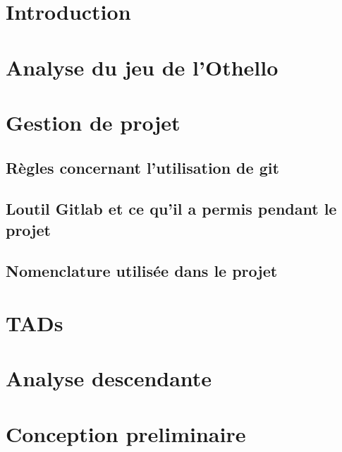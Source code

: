 


  

  \newpage
  \tableofcontents

  \newpage
  \section{Introduction}
    

  \newpage
  \section{Analyse du jeu de l'Othello}
    

  \newpage
  \section{Gestion de projet}
    

    \subsection{Règles concernant l’utilisation de git}
      

    \subsection{Loutil Gitlab et ce qu'il a permis pendant le projet}
      

    \subsection{Nomenclature utilisée dans le projet}
      


  \newpage
  \section{TADs}
    

  \newpage
  \section{Analyse descendante}
    
    

  \newpage
  \section{Conception preliminaire}
    
    
    

